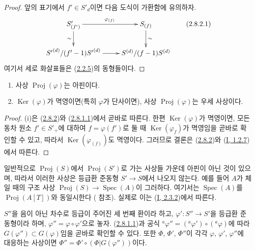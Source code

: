 \begin{proof}
앞의 표기에서 $f'\in S'_d$이면 다음 도식이 가환함에 유의하자.
\[
\label{II.2.8.2.1-ko}
  \xymatrix{
    S'_{(f')}\ar[r]^{\varphi_{(f)}}\ar[d]_{\sim}
    & S_{(f)}\ar[d]^{\sim}\\
    {S'}^{(d)}/(f'-1){S'}^{(d)}\ar[r]
    & S^{(d)}/(f-1)S^{(d)}
  }
\tag{2.8.2.1}
\]
여기서 세로 화살표들은
(\hyperref[II.2.2.5-ko]{2.2.5})의 동형들이다.
\end{proof}

\begin{corollary}[2.8.3]
\label{II.2.8.3-ko}
\begin{enumerate}
  \item[\rm(i)] 사상 $\operatorname{Proj}(\varphi)$는 아핀이다.
  \item[\rm(ii)] $\operatorname{Ker}(\varphi)$가 멱영이면(특히
    $\varphi$가 단사이면), 사상 $\operatorname{Proj}(\varphi)$는
    우세 사상이다.
\end{enumerate}
\end{corollary}

\begin{proof}
(i)은 (\hyperref[II.2.8.2-ko]{2.8.2})와
(\hyperref[II.2.8.1.1-ko]{2.8.1.1})에서 곧바로 따른다. 한편
$\operatorname{Ker}(\varphi)$가 멱영이면, 모든 동차 원소
$f'\in S'_+$에 대하여 $f=\varphi(f')$로 둘 때
$\operatorname{Ker}(\varphi_f)$가 멱영임을 곧바로 확인할 수 있고,
따라서 $\operatorname{Ker}(\varphi_{(f)})$도 멱영이다. 그러므로 결론은
(\hyperref[II.2.8.2-ko]{2.8.2})와
(\hyperref[I.1.2.7-ko]{I, 1.2.7})에서 따른다.
\end{proof}

일반적으로 $\operatorname{Proj}(S)$에서 $\operatorname{Proj}(S')$로 가는
사상들 가운데 아핀이 아닌 것이 있으며, 따라서 이러한 사상은 등급환 준동형
$S'\to S$에서 나오지 않는다. 예를 들어 $A$가 체일 때의 구조 사상
$\operatorname{Proj}(S)\to\operatorname{Spec}(A)$이 그러하다. 여기서는
$\operatorname{Spec}(A)$를 $\operatorname{Proj}(A[T])$와 동일시한다
( 참조). 실제로 이는
(\hyperref[I.2.3.2-ko]{I, 2.3.2})에서 따른다.

\begin{env}[2.8.4]
\label{II.2.8.4-ko}
$S''$을 음이 아닌 차수로 등급이 주어진 세 번째 환이라 하고,
$\varphi':S''\to S'$을 등급환 준동형이라 하며,
$\varphi''=\varphi\circ\varphi'$으로 놓자.
(\hyperref[II.2.8.1.1-ko]{2.8.1.1})과 공식
${}^a\varphi''=({}^a\varphi')\circ({}^a\varphi)$에 따라
$G(\varphi'')\subset G(\varphi)$임을 곧바로 확인할 수 있다. 또한
$\Phi$, $\Phi'$, $\Phi''$이 각각 $\varphi$, $\varphi'$, $\varphi''$에
대응하는 사상이면
$\Phi''=\Phi'\circ(\Phi|G(\varphi''))$이다.
\end{env}

